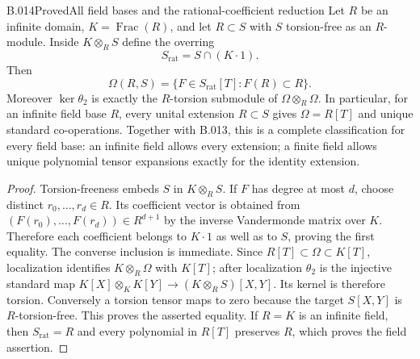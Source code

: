 \begin{saresult}{B.014}{Proved}{All field bases and the rational-coefficient reduction}
Let $R$ be an infinite domain, $K=\operatorname{Frac}(R)$, and let
$R\subset S$ with $S$ torsion-free as an $R$-module. Inside
$K\otimes_R S$ define the overring
\[
 S_{\mathrm{rat}}=S\cap(K\cdot1).
\]
Then
\[
 \Omega(R,S)=\{F\in S_{\mathrm{rat}}[T]:F(R)\subset R\}.
\]
Moreover $\ker\theta_2$ is exactly the $R$-torsion submodule of
$\Omega\otimes_R\Omega$. In particular, for an infinite field base
$R$, every unital extension $R\subset S$ gives $\Omega=R[T]$ and
unique standard co-operations. Together with B.013, this is a
complete classification for every field base: an infinite field
allows every extension; a finite field allows unique polynomial
tensor expansions exactly for the identity extension.
\end{saresult}
\begin{proof}
Torsion-freeness embeds $S$ in $K\otimes_R S$. If $F$ has degree
at most $d$, choose distinct $r_0,\ldots,r_d\in R$. Its coefficient
vector is obtained from $(F(r_0),\ldots,F(r_d))\in R^{d+1}$ by the
inverse Vandermonde matrix over $K$. Therefore each coefficient
belongs to $K\cdot1$ as well as to $S$, proving the first equality.
The converse inclusion is immediate. Since
$R[T]\subset\Omega\subset K[T]$, localization identifies
$K\otimes_R\Omega$ with $K[T]$; after localization $\theta_2$ is the
injective standard map $K[X]\otimes_KK[Y]\to(K\otimes_RS)[X,Y]$.
Its kernel is therefore torsion. Conversely a torsion tensor maps
to zero because the target $S[X,Y]$ is $R$-torsion-free. This proves
the asserted equality. If $R=K$ is an infinite field, then
$S_{\mathrm{rat}}=R$ and every polynomial in $R[T]$ preserves $R$,
which proves the field assertion.
\end{proof}

